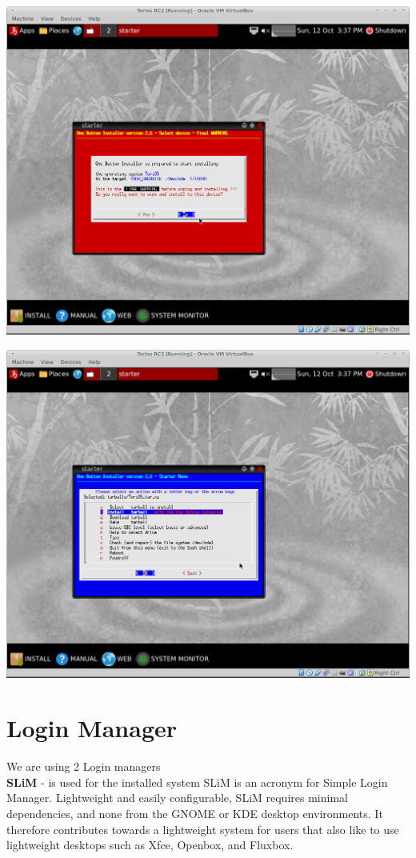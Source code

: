 \documentclass[12pt,a4paper]{book}
\begin{document}
\includegraphics[width=0.7\linewidth]{torios-rc2-install8-final-warning}

\includegraphics[width=0.7\linewidth]{torios-rc2-install9}





 
\newpage

\chapter{Login Manager}
We are using 2 Login managers\\
	
\textbf{SLiM} \cite{SliM}- is used for the installed system
SLiM is an acronym for Simple Login Manager. Lightweight and easily configurable, SLiM requires minimal dependencies, and none from the GNOME or KDE desktop environments. It therefore contributes towards a lightweight system for users that also like to use lightweight desktops such as Xfce, Openbox, and Fluxbox. \\
\end{document}
